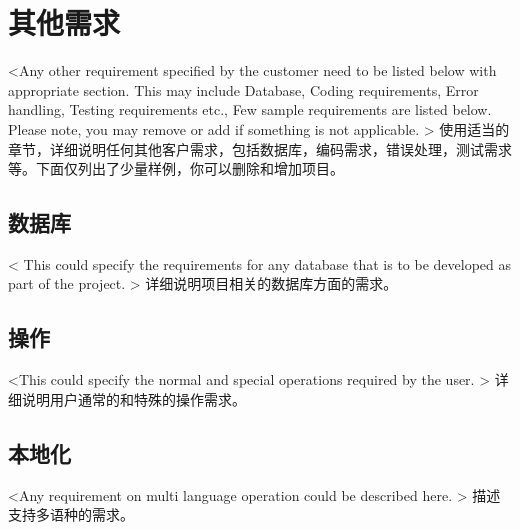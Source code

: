 \chapter{其他需求}
<Any other requirement specified by the customer need to be listed below with appropriate section. This may include Database, Coding requirements, Error handling, Testing requirements etc., Few sample requirements are listed below. Please note, you may remove or add if something is not applicable. >
使用适当的章节，详细说明任何其他客户需求，包括数据库，编码需求，错误处理，测试需求等。下面仅列出了少量样例，你可以删除和增加项目。
\section{数据库}
< This could specify the requirements for any database that is to be developed as part of the project. >
详细说明项目相关的数据库方面的需求。
\section{操作}
<This could specify the normal and special operations required by the user. >
详细说明用户通常的和特殊的操作需求。
\section{本地化}
<Any requirement on multi language operation could be described here. >
描述支持多语种的需求。
